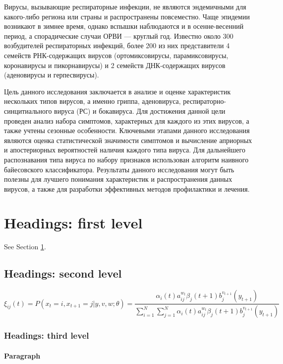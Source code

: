 \documentclass{article}
\begin{document}
Вирусы, вызывающие респираторные инфекции, не являются эндемичными для какого-либо региона или страны и распространены повсеместно. Чаще эпидемии возникают в зимнее время, однако вспышки наблюдаются и в осенне-весенний период, а спорадические случаи ОРВИ — круглый год. Известно около 300 возбудителей респираторных инфекций, более 200 из них представители 4 семейств РНК-содержащих вирусов (ортомиксовирусы, парамиксовирусы, коронавирусы и пикорнавирусы) и 2 семейств ДНК-содержащих вирусов (аденовирусы и герпесвирусы).

 Цель данного исследования заключается в анализе и оценке характеристик нескольких типов вирусов, а именно гриппа, аденовируса, респираторно-синцитиального вируса (РС) и бокавируса. Для достижения данной цели проведен анализ набора симптомов, характерных для каждого из этих вирусов, а также учтены сезонные особенности. Ключевыми этапами данного исследования являются оценка статистической значимости симптомов и вычисление априорных и апостериорных вероятностей наличия каждого типа вируса. Для дальнейшего распознавания типа вируса по набору признаков использован алгоритм наивного байесовского классификатора. Результаты данного исследования могут быть полезны для лучшего понимания характеристик и распространения данных вирусов, а также для разработки эффективных методов профилактики и лечения.


\section{Headings: first level}
\label{sec:headings}

\lipsum[4] See Section \ref{sec:headings}.

\subsection{Headings: second level}
\lipsum[5]
\begin{equation}
	\xi _{ij}(t)=P(x_{t}=i,x_{t+1}=j|y,v,w;\theta)= {\frac {\alpha _{i}(t)a^{w_t}_{ij}\beta _{j}(t+1)b^{v_{t+1}}_{j}(y_{t+1})}{\sum _{i=1}^{N} \sum _{j=1}^{N} \alpha _{i}(t)a^{w_t}_{ij}\beta _{j}(t+1)b^{v_{t+1}}_{j}(y_{t+1})}}
\end{equation}

\subsubsection{Headings: third level}
\lipsum[6]

\paragraph{Paragraph}
\lipsum[7]
\end{document}
